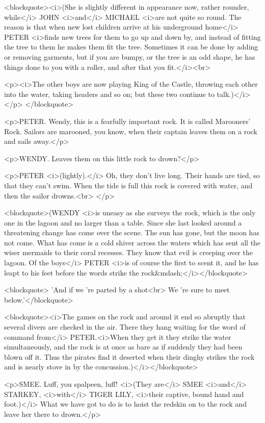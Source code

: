 <blockquote><i>(She is slightly different in appearance now, rather
rounder, while</i> JOHN <i>and</i> MICHAEL <i>are not quite so round.
The reason is that when new lost children arrive at his underground
home</i> PETER <i>finds new trees for them to go up and down by, and
instead of fitting the tree to them he makes them fit the tree.
Sometimes it can be done by adding or removing garments, but if you
are bumpy, or the tree is an odd shape, he has things done to you
with a roller, and after that you fit.</i><br>
 

<p><i>The other boys are now playing King of the Castle, throwing
each other into the water, taking headers and so on; but these two
continue to talk.)</i></p>
</blockquote>

<p>PETER. Wendy, this is a fearfully important rock. It is called
Marooners' Rock. Sailors are marooned, you know, when their captain
leaves them on a rock and sails away.</p>

<p>WENDY. Leaves them on this little rock to drown?</p>

<p>PETER <i>(lightly).</i> Oh, they don't live long. Their hands are
tied, so that they can't swim. When the tide is full this rock is
covered with water, and then the sailor drowns.<br>
</p>

<blockquote>(WENDY <i>is uneasy as she surveys the rock, which is the
only one in the lagoon and no larger than a table. Since she last
looked around a threatening change has come over the scene. The sun
has gone, but the moon has not come. What has come is a cold shiver
across the waters which has sent all the wiser mermaids to their
coral recesses. They know that evil is creeping over the lagoon. Of
the boys</i> PETER <i>is of course the first to scent it, and he has
leapt to his feet before the words strike the
rock&mdash;</i></blockquote>

<blockquote>    'And if we 're parted by a shot<br>
    We 're sure to meet below.'</blockquote>

<blockquote><i>The games on the rock and around it end so abruptly
that several divers are checked in the air. There they hang waiting
for the word of command from</i> PETER.<i>When they get it they
strike the water simultaneously, and the rock is at once as bare as
if suddenly they had been blown off it. Thus the pirates find it
deserted when their dinghy strikes the rock and is nearly stove in by
the concussion.)</i></blockquote>

<p>SMEE. Luff, you spalpeen, luff! <i>(They are</i> SMEE <i>and</i>
STARKEY, <i>with</i> TIGER LILY, <i>their captive, bound hand and
foot.)</i> What we have got to do is to hoist the redskin on to the
rock and leave her there to drown.</p>

